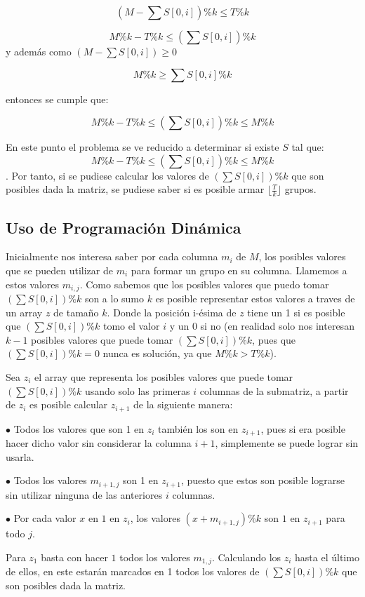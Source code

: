 \documentclass[article]{llncs}
\begin{document}
$$(M - \sum S[0, i])\% k \leq T\%k$$

$$M \%k - T\%k \leq (\sum S[0,i])\%k$$ 
y además como $(M - \sum S[0,i]) \geq 0$

$$M\%k \geq \sum S[0, i] \%k$$

entonces se cumple que: 

$$M\%k - T\% k \leq (\sum S[0,i])\%k \leq M \% k$$

En este punto el problema se ve reducido a determinar si existe $S$ tal que: $$M\%k - T\% k \leq (\sum S[0,i])\%k \leq M \% k$$.
Por tanto, si se pudiese calcular los valores de $(\sum S[0,i])\%k$ que son posibles dada la matriz, se pudiese saber si es posible armar $\lfloor\frac{T}{k}\rfloor$
grupos.

\subsection{Uso de Programación Dinámica}

Inicialmente nos interesa saber por cada columna $m_i$ de $M$, los posibles valores que se pueden utilizar de $m_i$ para formar un grupo en su columna. Llamemos a estos valores $m_{i,j}$.
Como sabemos que los posibles valores que puedo tomar $(\sum S[0,i])\%k$ son a lo sumo $k$ es posible representar estos valores a traves de un array $z$ de tamaño $k$. Donde la posición i-ésima de $z$ tiene
un 1 si es posible que $(\sum S[0,i])\%k$ tomo el valor $i$ y un 0 si no (en realidad solo nos interesan $k-1$ posibles valores que puede tomar $(\sum S[0,i])\%k$, pues que $(\sum S[0,i])\%k = 0$ nunca es solución, ya que $M\%k > T\%k$).

Sea $z_i$ el array que representa los posibles valores que puede tomar $(\sum S[0,i])\%k$ usando solo las primeras $i$ columnas de la submatriz,
a partir de $z_i$ es posible calcular $z_{i+1}$ de la siguiente manera:

$\bullet $ Todos los valores que son 1 en $z_i$ también los son en $z_{i+1}$, pues si era posible hacer dicho valor sin considerar la columna $i+1$, simplemente se puede lograr sin usarla.

$\bullet $ Todos los valores $m_{i+1,j}$ son 1 en $z_{i+1}$, puesto que estos son posible lograrse sin utilizar ninguna de las anteriores $i$ columnas.

$\bullet $ Por cada valor $x$ en $1$ en $z_i$, los valores $(x+m_{i+1,j}) \% k$ son $1$ en $z_{i+1}$ para todo $j$.

Para $z_1$ basta con hacer $1$ todos los valores $m_{1,j}$. Calculando los $z_i$ hasta el último de ellos, en este estarán marcados en 1 todos los valores de $(\sum S[0,i])\%k$ que son posibles dada la matriz.
\end{document}

